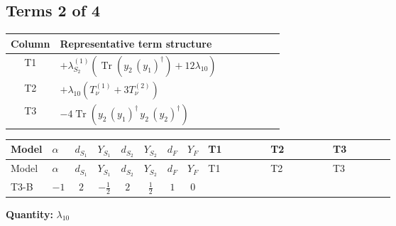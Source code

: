 \documentclass[8pt]{article}
\begin{document}
\begin{landscape}
\subsection*{Terms 2 of 4}
\begin{center}
\begin{tabular}{@{}c >{\raggedright\arraybackslash}p{0.82\linewidth}@{}}
\toprule
Column & Representative term structure \\
\midrule
T1 & \(\displaystyle +{\lambda_{S_2}^{(1)}} (\operatorname{Tr}\!\left({y_2}\,\left({y_1}\right)^{\dagger}\right)+12 {\lambda_{10}})\) \\
\midrule
T2 & \(\displaystyle +{\lambda_{10}} (T_{\nu}^{(1)}+3 T_{\nu}^{(2)})\) \\
\midrule
T3 & \(\displaystyle -4 \operatorname{Tr}\!\left({y_2}\,\left({y_1}\right)^{\dagger}\,{y_2}\,\left({y_2}\right)^{\dagger}\right)\) \\
\midrule
\bottomrule
\end{tabular}
\end{center}
\smallskip
\tiny
\begin{longtable}{@{}llcccccc >{\raggedright\arraybackslash}p{0.21\linewidth} >{\raggedright\arraybackslash}p{0.21\linewidth} >{\raggedright\arraybackslash}p{0.21\linewidth}@{}}
\toprule
Model & $\alpha$ & $d_{S_1}$ & $Y_{S_1}$ & $d_{S_2}$ & $Y_{S_2}$ & $d_F$ & $Y_F$ & T1 & T2 & T3 \\
\midrule
\endfirsthead
\toprule
Model & $\alpha$ & $d_{S_1}$ & $Y_{S_1}$ & $d_{S_2}$ & $Y_{S_2}$ & $d_F$ & $Y_F$ & T1 & T2 & T3 \\
\midrule
\endhead
T3-B & $-1$ & $2$ & $-\frac{1}{2}$ & $2$ & $\frac{1}{2}$ & $1$ & $0$ & \scriptsize\adjustbox{max width=\linewidth}{$\begin{gathered} +{\lambda_{S_2}^{(1)}} (\operatorname{Tr}\!\left({y_2}\,\left({y_1}\right)^{\dagger}\right)+12 {\lambda_{10}})\end{gathered}$} & \scriptsize\adjustbox{max width=\linewidth}{$\begin{gathered} +{\lambda_{10}} (T_{\nu}^{(1)}+3 T_{\nu}^{(2)})\end{gathered}$} & \scriptsize\adjustbox{max width=\linewidth}{$\begin{gathered} -4 \operatorname{Tr}\!\left({y_2}\,\left({y_1}\right)^{\dagger}\,{y_2}\,\left({y_2}\right)^{\dagger}\right)\end{gathered}$} \\
\midrule
\bottomrule
\end{longtable}
\clearpage
\noindent\textbf{Quantity: }$\lambda_{10}$\par\smallskip

\end{landscape}
\end{document}
